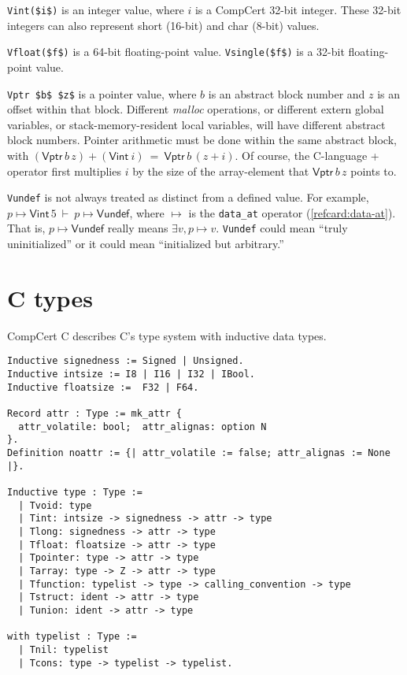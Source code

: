 \documentclass[12pt,fleqn,openany,oneside,showtrims]{memoir}
\newcommand{\ychapter}[2]{\chapter[#1]{#1}}
\begin{document}
\lstinline{Vint($i$)} is an integer value,
where $i$ is a CompCert 32-bit integer.  These 32-bit integers
can also
represent short (16-bit) and char (8-bit) values.

\lstinline{Vfloat($f$)} is a 64-bit floating-point value.\newline
\lstinline{Vsingle($f$)} is a 32-bit floating-point value.

\lstinline{Vptr $b$ $z$} is a pointer value,
where $b$ is an abstract block number and $z$ is an offset
within that block.  Different \emph{malloc} operations,
or different extern global variables, or
stack-memory-resident local variables,
will have different abstract block numbers.
Pointer arithmetic must be done within the same abstract block,
with $(\mathsf{Vptr}\,b\,z)+(\mathsf{Vint}~i)~=~\mathsf{Vptr}\,b\,(z+i)$.
Of course, the C-language + operator first multiplies $i$
by the size of the array-element that
$\mathsf{Vptr}\,b\,z$ points to.

\lstinline{Vundef} is not always treated as distinct from a defined value.
For example, $p\mapsto \mathsf{Vint}\,5 ~\vdash~ p\mapsto \mathsf{Vundef}$,
where $\mapsto$ is the \lstinline{data_at} operator (\autoref{refcard:data-at}).
That is, $p\mapsto \mathsf{Vundef}$ really means
$\exists v, p\mapsto v$.  \lstinline{Vundef} could mean
``truly uninitialized'' or it could mean ``initialized but arbitrary.''


\ychapter{C types}{(\file{compcert/cfrontend/Ctypes.v})}
\label{refcard:type}
CompCert C describes C's type system with
inductive data types.

\begin{lstlisting}
Inductive signedness := Signed | Unsigned.
Inductive intsize := I8 | I16 | I32 | IBool.
Inductive floatsize :=  F32 | F64.

Record attr : Type := mk_attr {
  attr_volatile: bool;  attr_alignas: option N
}.
Definition noattr := {| attr_volatile := false; attr_alignas := None |}.

Inductive type : Type :=
  | Tvoid: type
  | Tint: intsize -> signedness -> attr -> type
  | Tlong: signedness -> attr -> type
  | Tfloat: floatsize -> attr -> type
  | Tpointer: type -> attr -> type
  | Tarray: type -> Z -> attr -> type
  | Tfunction: typelist -> type -> calling_convention -> type
  | Tstruct: ident -> attr -> type
  | Tunion: ident -> attr -> type

with typelist : Type :=
  | Tnil: typelist
  | Tcons: type -> typelist -> typelist.
\end{lstlisting}
\end{document}
